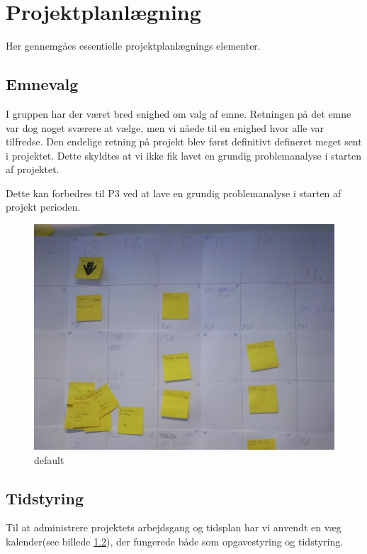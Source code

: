 \section{Projektplanl\ae{}gning}
Her gennemg\aa{}es essentielle projektplanl\ae{}gnings elementer. 

\subsection{Emnevalg}
I gruppen har der v\ae{}ret bred enighed om valg af emne. Retningen p\aa{} det emne var dog noget sv\ae{}rere at v\ae{}lge, men vi n\aa{}ede til en enighed hvor alle var tilfredse. 
Den endelige retning p\aa{} projekt blev f\o{}rst definitivt defineret meget sent i projektet.
Dette skyldtes at vi ikke fik lavet en grundig problemanalyse i starten af projektet.

Dette kan forbedres til P3 ved at lave en grundig problemanalyse i starten af projekt perioden. 

\begin{figure}[htbp]
\begin{center}
\includegraphics[width=\textwidth]{Billede0075.jpg}
\caption{default}
\label{default}
\end{center}
\end{figure}


\subsection{Tidstyring}
Til at administrere projektets arbejdsgang og tidsplan har vi anvendt en v\ae{}g kalender(see billede \ref{}), der fungerede b\aa{}de som opgavestyring og tidstyring. 

